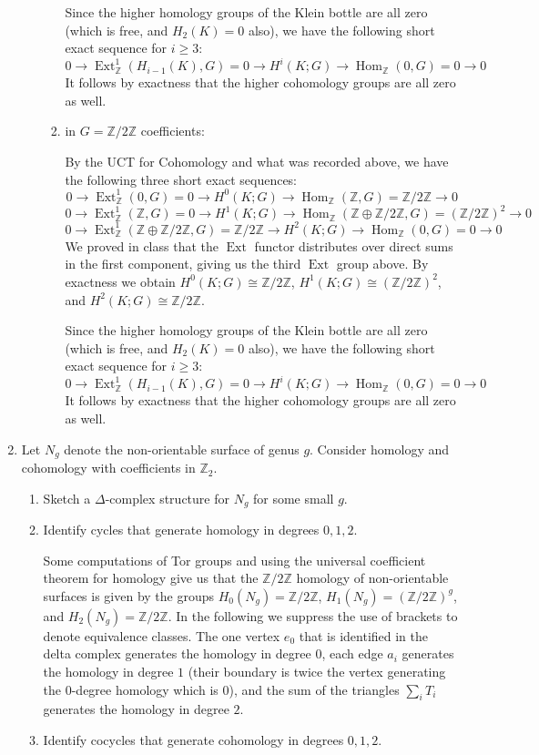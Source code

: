 \documentclass[11pt]{article}
\DeclareMathOperator{\Hom}{Hom}
\DeclareMathOperator{\Ext}{Ext}
\begin{document}
\begin{enumerate}
\begin{enumerate}
\begin{enumerate}
        Since the higher homology groups of the Klein bottle are all zero (which is free, and $H_2(K)=0$ also), we have the following short exact sequence for $i\geq 3$: \[0\to \Ext_\mathbb{Z}^1(H_{i-1}(K), G)=0\to H^i(K;G)\to \Hom_\mathbb{Z}(0,G)=0\to 0\] It follows by exactness that the higher cohomology groups are all zero as well.
        \item in $G=\mathbb{Z}/2\mathbb{Z}$ coefficients:
        
        By the UCT for Cohomology and what was recorded above, we have the following three short exact sequences:
        \[0\to \Ext_\mathbb{Z}^1(0, G)=0\to H^0(K;G)\to \Hom_\mathbb{Z}(\mathbb{Z},G)=\mathbb{Z}/2\mathbb{Z}\to 0\]
        \[0\to \Ext_\mathbb{Z}^1(\mathbb{Z}, G)=0\to H^1(K;G)\to \Hom_\mathbb{Z}(\mathbb{Z}\oplus \mathbb{Z}/2\mathbb{Z},G)=(\mathbb{Z}/2\mathbb{Z})^2\to 0\]
        \[0\to \Ext_\mathbb{Z}^1(\mathbb{Z}\oplus \mathbb{Z}/2\mathbb{Z}, G)= \mathbb{Z}/2\mathbb{Z}\to H^2(K;G)\to \Hom_\mathbb{Z}(0,G)=0\to 0\] 
        We proved in class that the $\Ext$ functor distributes over direct sums in the first component, giving us the third $\Ext$ group above. By exactness we obtain $H^0(K;G)\cong\mathbb{Z}/2\mathbb{Z}$, $H^1(K;G)\cong (\mathbb{Z}/2\mathbb{Z})^2$, and $H^2(K;G)\cong\mathbb{Z}/2\mathbb{Z}$.

        Since the higher homology groups of the Klein bottle are all zero (which is free, and $H_2(K)=0$ also), we have the following short exact sequence for $i\geq 3$: \[0\to \Ext_\mathbb{Z}^1(H_{i-1}(K), G)=0\to H^i(K;G)\to \Hom_\mathbb{Z}(0,G)=0\to 0\] It follows by exactness that the higher cohomology groups are all zero as well.
      \end{enumerate}
    \end{enumerate}
    \item Let $N_g$ denote the non-orientable surface of genus $g$. Consider homology and cohomology with coefficients in $\mathbb{Z}_2$.\begin{enumerate}[label=(\alph*)]
        \item Sketch a $\Delta$-complex structure for $N_g$ for some small $g$.\vspace*{7cm}
        \item Identify cycles that generate homology in degrees $0,1,2$. 
        
        Some computations of Tor groups and using the universal coefficient theorem for homology give us that the $\mathbb{Z}/2\mathbb{Z}$ homology of non-orientable surfaces is given by the groups $H_0(N_g) =  \mathbb{Z}/2\mathbb{Z}$, $H_1(N_g) = (\mathbb{Z}/2\mathbb{Z})^g$, and $H_2(N_g) = \mathbb{Z}/2\mathbb{Z}$. In the following we suppress the use of brackets to denote equivalence classes. The one vertex $e_0$ that is identified in the delta complex generates the homology in degree $0$, each edge $a_i$ generates the homology in degree $1$ (their boundary is twice the vertex generating the $0$-degree homology which is $0$), and the sum of the triangles $\sum_i T_i$ generates the homology in degree $2$. 
        \item Identify cocycles that generate cohomology in degrees $0,1,2$. 
        

\end{enumerate}
\end{enumerate}
\end{document}
